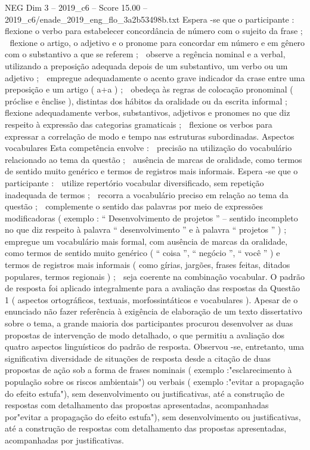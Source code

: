 \begin{textsample}{NEG Dim 3 – 2019\_c6 – Score 15.00 – 2019\_c6/enade\_2019\_eng\_flo\_3a2b53498b.txt}
Espera -se que o participante :  flexione o verbo para estabelecer concordância de número com o sujeito da frase ;  flexione o artigo, o adjetivo e o pronome para concordar em número e em gênero com o substantivo a que se referem ;  observe a regência nominal e a verbal, utilizando a preposição adequada depois de um substantivo, um verbo ou um adjetivo ;  empregue adequadamente o acento grave indicador da crase entre uma preposição e um artigo ( a+a ) ;  obedeça às regras de colocação pronominal ( próclise e ênclise ), distintas dos hábitos da oralidade ou da escrita informal ;  flexione adequadamente verbos, substantivos, adjetivos e pronomes no que diz respeito à expressão das categorias gramaticais ;  flexione os verbos para expressar a correlação de modo e tempo nas estruturas subordinadas.
Aspectos vocabulares Esta competência envolve :  precisão na utilização do vocabulário relacionado ao tema da questão ;  ausência de marcas de oralidade, como termos de sentido muito genérico e termos de registros mais informais.
Espera -se que o participante :  utilize repertório vocabular diversificado, sem repetição inadequada de termos ;  recorra a vocabulário preciso em relação ao tema da questão ;  complemente o sentido das palavras por meio de expressões modificadoras ( exemplo : “ Desenvolvimento de projetos ” – sentido incompleto no que diz respeito à palavra “ desenvolvimento ” e à palavra “ projetos ” ) ;  empregue um vocabulário mais formal, com ausência de marcas da oralidade, como termos de sentido muito genérico ( “ coisa ”, “ negócio ”, “ você ” ) e termos de registros mais informais ( como gírias, jargões, frases feitas, ditados populares, termos regionais ) ;  seja coerente na combinação vocabular.
O padrão de resposta foi aplicado integralmente para a avaliação das respostas da Questão 1 ( aspectos ortográficos, textuais, morfossintáticos e vocabulares ).
Apesar de o enunciado não fazer referência à exigência de elaboração de um texto dissertativo sobre o tema, a grande maioria dos participantes procurou desenvolver as duas propostas de intervenção de modo detalhado, o que permitiu a avaliação dos quatro aspectos linguísticos do padrão de resposta.
Observou -se, entretanto, uma significativa diversidade de situações de resposta desde a citação de duas propostas de ação sob a forma de frases nominais ( exemplo :"esclarecimento à população sobre os riscos ambientais") ou verbais ( exemplo :"evitar a propagação do efeito estufa"), sem desenvolvimento ou justificativas, até a construção de respostas com detalhamento das propostas apresentadas, acompanhadas por"evitar a propagação do efeito estufa"), sem desenvolvimento ou justificativas, até a construção de respostas com detalhamento das propostas apresentadas, acompanhadas por justificativas.

\end{textsample}
